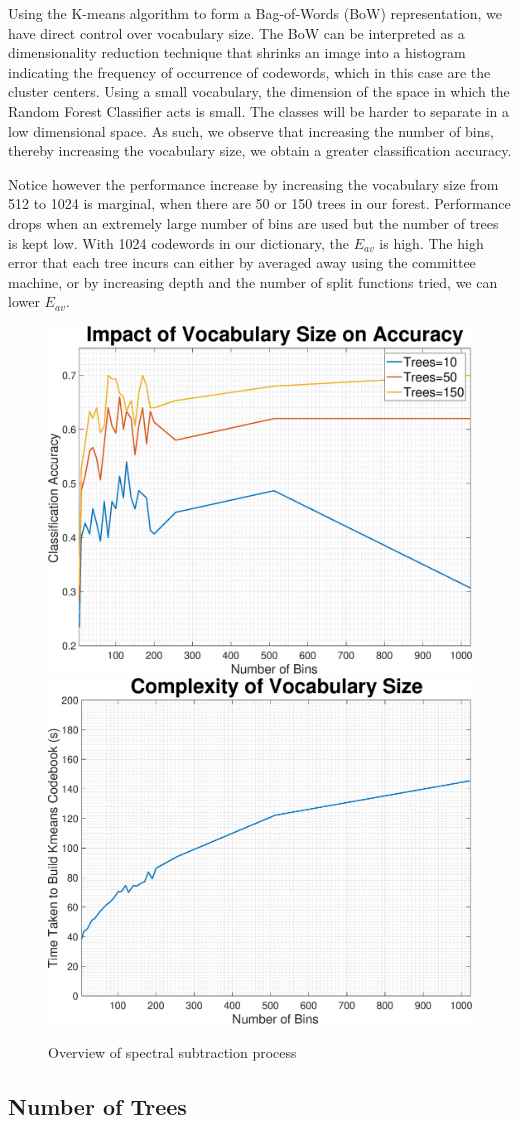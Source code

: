 \documentclass[a4paper,pra,twocolumn,10pt,aps,longbibliography,nobalancelastpage]{revtex4-1}
\begin{document}
Using the K-means algorithm to form a Bag-of-Words (BoW) representation, we have direct control over vocabulary size. The BoW can be interpreted as a dimensionality reduction technique that shrinks an image into a histogram indicating the frequency of occurrence of codewords, which in this case are the cluster centers. Using a small vocabulary, the dimension of the space in which the Random Forest Classifier acts is small. The classes will be harder to separate in a low dimensional space. As such, we observe that increasing the number of bins, thereby increasing the vocabulary size, we obtain a greater classification accuracy. 

Notice however the performance increase by increasing the vocabulary size from 512 to 1024 is marginal, when there are 50 or 150 trees in our forest. Performance drops when an extremely large number of bins are used but the number of trees is kept low. With 1024 codewords in our dictionary, the $E_{av}$ is high. The high error that each tree incurs can either by averaged away using the committee machine, or by increasing depth and the number of split functions tried, we can lower $E_{av}$. 
\begin{figure}[H]
	\centering
    \includegraphics[width=0.49\columnwidth]{numBins_acc}
	\includegraphics[width=0.49\columnwidth]{numBins_complexity}
    \caption{Overview of spectral subtraction process}
\end{figure}

\subsection*{Number of Trees}
\end{document}
